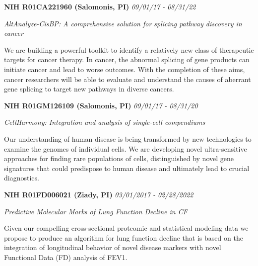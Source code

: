 \documentclass[margin,line]{res}
\newenvironment{list3}{
  \begin{list}{}{%
      \setlength{\itemsep}{0in}
      \setlength{\parsep}{0in} \setlength{\parskip}{0in}
      \setlength{\topsep}{0in} \setlength{\partopsep}{0in} 
      \setlength{\leftmargin}{0in}}}{\end{list}}
\begin{document}
\begin{resume}
\vspace*{.1in}

\begin{list3} \itemsep 4pt
    \item[] \textbf{NIH R01CA221960 (Salomonis, PI)} \hfill \textit{09/01/17 - 08/31/22}
\item[] \textit{AltAnalyze-CisBP: A comprehensive solution for splicing pathway discovery in cancer}
\item[] We are building a powerful toolkit to identify a relatively new class of therapeutic targets for cancer therapy. In cancer, the abnormal splicing of gene products can initiate cancer and lead to worse outcomes. With the completion of these aims, cancer researchers will be able to evaluate and understand the causes of aberrant gene splicing to target new pathways in diverse cancers.
\end{list3}

\vspace*{.1in}

\begin{list3} \itemsep 4pt
    \item[] \textbf{NIH R01GM126109 (Salomonis, PI)} \hfill \textit{09/01/17 - 08/31/20}
\item[] \textit{CellHarmony: Integration and analysis of single-cell compendiums}
\item[] Our understanding of human disease is being transformed by new technologies to examine the genomes of individual cells. We are developing novel ultra-sensitive approaches for finding rare populations of cells, distinguished by novel gene signatures that could predispose to human disease and ultimately lead to crucial diagnostics.
\end{list3}

\vspace*{.1in}

\begin{list3} \itemsep 4pt
    \item[] \textbf{NIH R01FD006021 (Ziady, PI)} \hfill \textit{03/01/2017 - 02/28/2022}
\item[] \textit{Predictive Molecular Marks of Lung Function Decline in CF}
\item[] Given our compelling cross-sectional proteomic and statistical modeling data we propose to produce an algorithm for lung function decline that is based on the integration of longitudinal behavior of novel disease markers with novel Functional Data (FD) analysis of FEV1.
\end{list3}


\end{resume}
\end{document}
